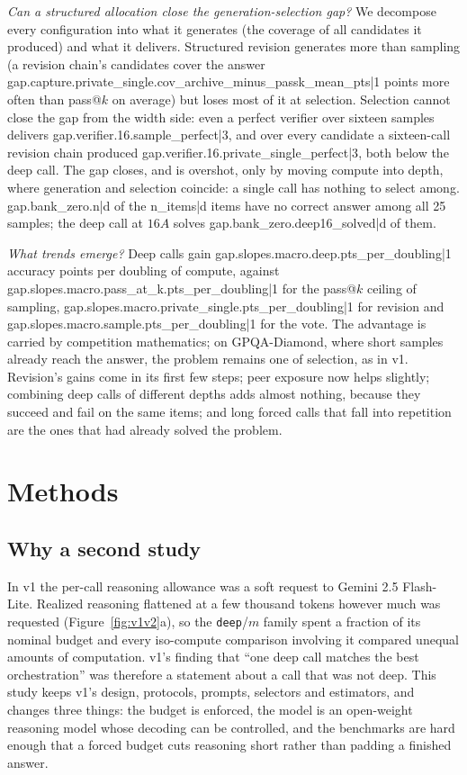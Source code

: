 \documentclass[11pt]{article}
\begin{document}
\emph{Can a structured allocation close the generation-selection gap?} We decompose every configuration
into what it generates (the coverage of all candidates it produced) and what it delivers. Structured
revision generates more than sampling (a revision chain's candidates cover the answer
{{gap.capture.private_single.cov_archive_minus_passk_mean_pts|1}} points more often than pass@$k$ on average)
but loses most of it at selection. Selection cannot close the gap from the width side: even a perfect
verifier over sixteen samples delivers {{gap.verifier.16.sample_perfect|3}}, and over every candidate a
sixteen-call revision chain produced {{gap.verifier.16.private_single_perfect|3}}, both below the deep call.
The gap closes, and is overshot, only by moving compute into depth, where generation and selection
coincide: a single call has nothing to select among. {{gap.bank_zero.n|d}} of the {{n_items|d}} items have
no correct answer among all 25 samples; the deep call at $16A$ solves {{gap.bank_zero.deep16_solved|d}} of
them.

\emph{What trends emerge?} Deep calls gain {{gap.slopes.macro.deep.pts_per_doubling|1}} accuracy points per
doubling of compute, against {{gap.slopes.macro.pass_at_k.pts_per_doubling|1}} for the pass@$k$ ceiling of
sampling, {{gap.slopes.macro.private_single.pts_per_doubling|1}} for revision and
{{gap.slopes.macro.sample.pts_per_doubling|1}} for the vote. The advantage is carried by competition
mathematics; on GPQA-Diamond, where short samples already reach the answer, the problem remains one of
selection, as in v1. Revision's gains come in its first few steps; peer exposure now helps slightly;
combining deep calls of different depths adds almost nothing, because they succeed and fail on the same
items; and long forced calls that fall into repetition are the ones that had already solved the problem.

\section{Methods}

\subsection{Why a second study}

In v1 the per-call reasoning allowance was a soft request to Gemini 2.5 Flash-Lite. Realized reasoning
flattened at a few thousand tokens however much was requested (Figure~\ref{fig:v1v2}a), so the
\texttt{deep}/$m$ family spent a fraction of its nominal budget and every iso-compute comparison involving
it compared unequal amounts of computation. v1's finding that ``one deep call matches the best
orchestration'' was therefore a statement about a call that was not deep. This study keeps v1's design,
protocols, prompts, selectors and estimators, and changes three things: the budget is enforced, the
model is an open-weight reasoning model whose decoding can be controlled, and the benchmarks are hard
enough that a forced budget cuts reasoning short rather than padding a finished answer.
\end{document}
